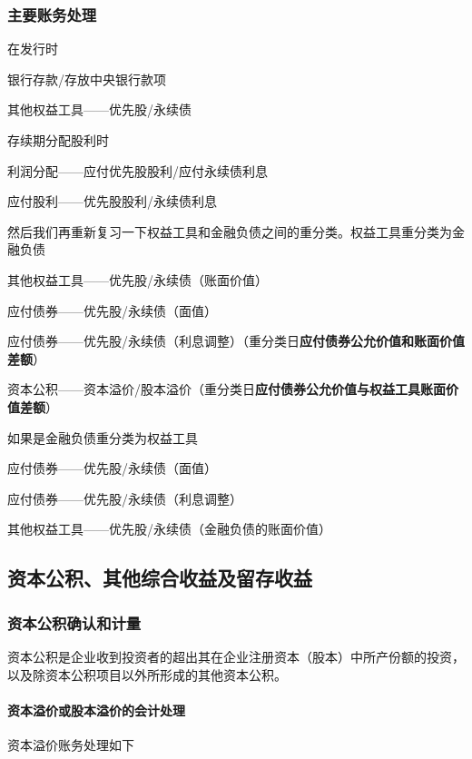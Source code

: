 \documentclass[UTF8,12pt]{ctexart}
\newenvironment{Dr}{%
	\begin{list}{}%
		{
			\setlength{\leftmargin}{2em}
			\setlength{\labelwidth}{2em}
			\setlength{\labelsep}{0pt}
			\setlength{\itemindent}{0pt}
			\setlength{\listparindent}{0pt}
			\setlength{\parsep}{0pt}
			\setlength{\topsep}{0pt}
		}
		\item[\textbf{借：}]
	}{%
	\end{list}
}
\newenvironment{Cr}{%
	\begin{list}{}%
		{
			\setlength{\leftmargin}{3em}
			\setlength{\labelwidth}{2em}
			\setlength{\labelsep}{0pt}
			\setlength{\itemindent}{0pt}
			\setlength{\listparindent}{0pt}
			\setlength{\parsep}{0pt}
			\setlength{\topsep}{0pt}
		}
		\item[\textbf{贷：}]
	}{%
	\end{list}
}
\numberwithin{equation}{section} %
\numberwithin{figure}{section}
\numberwithin{table}{section}
\begin{document}
	\subsubsection{主要账务处理}
	在发行时
	\begin{Dr}
		银行存款/存放中央银行款项
	\end{Dr}
	\begin{Cr}
		其他权益工具——优先股/永续债
	\end{Cr}
	
	存续期分配股利时
	\begin{Dr}
		利润分配——应付优先股股利/应付永续债利息
	\end{Dr}
	\begin{Cr}
		应付股利——优先股股利/永续债利息
	\end{Cr}
	
	然后我们再重新复习一下权益工具和金融负债之间的重分类。权益工具重分类为金融负债
	\begin{Dr}
		其他权益工具——优先股/永续债（账面价值）
	\end{Dr}
	\begin{Cr}
		应付债券——优先股/永续债（面值）
		
		应付债券——优先股/永续债（利息调整）（重分类日\textbf{应付债券公允价值和账面价值差额}）
		
		资本公积——资本溢价/股本溢价（重分类日\textbf{应付债券公允价值与权益工具账面价值差额}）
	\end{Cr}
	
	如果是金融负债重分类为权益工具
	\begin{Dr}
		应付债券——优先股/永续债（面值）
		
		应付债券——优先股/永续债（利息调整）
	\end{Dr}
	\begin{Cr}
		其他权益工具——优先股/永续债（金融负债的账面价值）
	\end{Cr}
	
	\subsection{资本公积、其他综合收益及留存收益}
	
	\subsubsection{资本公积确认和计量}
	资本公积是企业收到投资者的超出其在企业注册资本（股本）中所产份额的投资，以及除资本公积项目以外所形成的其他资本公积。
	
	\paragraph{资本溢价或股本溢价的会计处理}
	资本溢价账务处理如下
	
\end{document}
